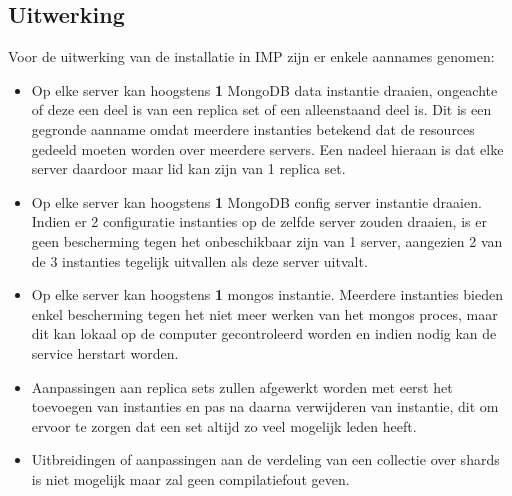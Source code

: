 \subsection{Uitwerking}
Voor de uitwerking van de installatie in IMP zijn er enkele aannames genomen:
\begin{itemize}
	\item Op elke server kan hoogstens \textbf{1} MongoDB data instantie draaien, ongeachte of deze een deel is van een replica set of een alleenstaand deel is. Dit is een gegronde aanname omdat meerdere instanties betekend dat de resources gedeeld moeten worden over meerdere servers. Een nadeel hieraan is dat elke server daardoor maar lid kan zijn van 1 replica set. 
	\item Op elke server kan hoogstens \textbf{1} MongoDB config server instantie draaien. Indien er 2 configuratie instanties op de zelfde server zouden draaien, is er geen bescherming tegen het onbeschikbaar zijn van 1 server, aangezien 2 van de 3 instanties tegelijk uitvallen als deze server uitvalt. 
	\item Op elke server kan hoogstens \textbf{1} mongos instantie. Meerdere instanties bieden enkel bescherming tegen het niet meer werken van het mongos proces, maar dit kan lokaal op de computer gecontroleerd worden en indien nodig kan de service herstart worden. 
	\item Aanpassingen aan replica sets zullen afgewerkt worden met eerst het toevoegen van instanties en pas na daarna verwijderen van instantie, dit om ervoor te zorgen dat een set altijd zo veel mogelijk leden heeft. 
	\item Uitbreidingen of aanpassingen aan de verdeling van een collectie over shards is niet mogelijk maar zal geen compilatiefout geven. 
\end{itemize}

